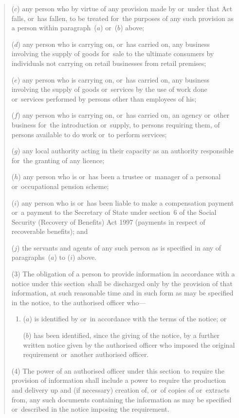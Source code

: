 \documentclass[12pt,a4paper]{article}
\begin{document}
\begin{quotation}
\begin{enumerate}
($c$) any person who by virtue of any provision made by or~under that Act falls, or~has fallen, to be treated for~the purposes of any such provision as a person within paragraph~($a$)  or~($b$)  above;

($d$) any person who is carrying on, or~has carried on, any business involving the supply of goods for~sale to the ultimate consumers by individuals not carrying on retail businesses from retail premises;

($e$) any person who is carrying on, or~has carried on, any business involving the supply of goods or~services by the use of work done or~services performed by persons other than employees of his;

($f$) any person who is carrying on, or~has carried on, an agency or~other business for~the introduction or~supply, to persons requiring them, of persons available to do work or~to perform services;

($g$) any local authority acting in their capacity as an authority responsible for~the granting of any licence;

($h$) any person who is or~has been a trustee or~manager of a personal or~occupational pension scheme;

($i$) any person who is or~has been liable to make a compensation payment or~a payment to the Secretary of State under section~6 of the Social Security (Recovery of Benefits) Act 1997 (payments in respect of recoverable benefits); and

($j$) the servants and agents of any such person as is specified in any of paragraphs~($a$)  to ($i$)  above.
\end{enumerate}

(3) The obligation of a person to provide information in accordance with a notice under this section~shall be discharged only by the provision of that information, at such reasonable time and in such form as may be specified in the notice, to the authorised officer who—
\begin{enumerate}\item[]
($a$) is identified by or~in accordance with the terms of the notice; or

($b$) has been identified, since the giving of the notice, by a further written notice given by the authorised officer who imposed the original requirement or~another authorised officer.
\end{enumerate}

(4) The power of an authorised officer under this section~to require the provision of information shall include a power to require the production and delivery up and (if necessary) creation of, or~of copies of or~extracts from, any such documents containing the information as may be specified or~described in the notice imposing the requirement.


\end{quotation}
\end{document}
